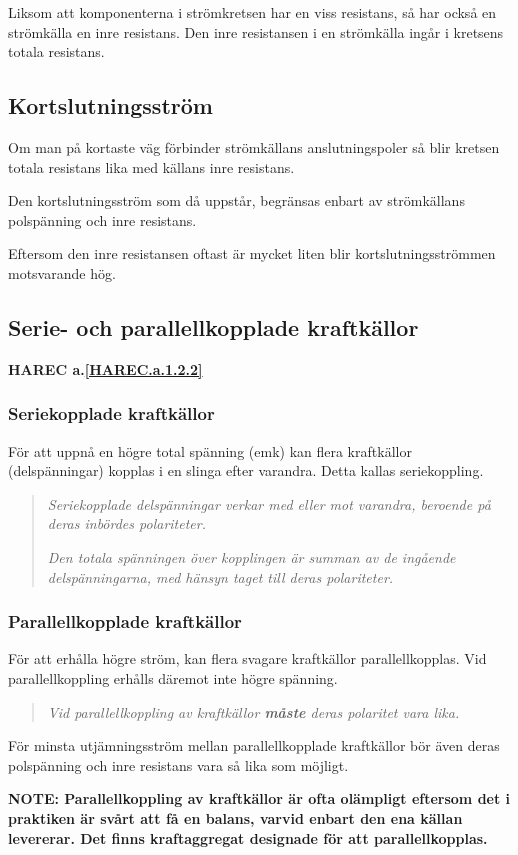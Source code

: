 Liksom att komponenterna i strömkretsen har en viss resistans, så har också en
strömkälla en inre resistans. Den inre resistansen i en strömkälla ingår i
kretsens totala resistans.

\subsection{Kortslutningsström}

Om man på kortaste väg förbinder strömkällans anslutningspoler så blir kretsen
totala resistans lika med källans inre resistans.

Den kortslutningsström som då uppstår, begränsas enbart av strömkällans
polspänning och inre resistans.

Eftersom den inre resistansen oftast är mycket liten blir kortslutningsströmmen
motsvarande hög.

\subsection{Serie- och parallellkopplade kraftkällor}
\textbf{HAREC a.\ref{HAREC.a.1.2.2}\label{myHAREC.a.1.2.2}}

\subsubsection{Seriekopplade kraftkällor}

För att uppnå en högre total spänning (emk) kan flera kraftkällor
(delspänningar) kopplas i en slinga efter varandra. Detta kallas seriekoppling.

\begin{quote}
\emph{Seriekopplade delspänningar verkar med eller mot varandra, beroende på
deras inbördes polariteter.}

\emph{Den totala spänningen över kopplingen är summan av de ingående
delspänningarna, med hänsyn taget till deras polariteter.}
\end{quote}

\subsubsection{Parallellkopplade kraftkällor}

För att erhålla högre ström, kan flera svagare kraftkällor parallellkopplas.
Vid parallellkoppling erhålls däremot inte högre spänning.

\begin{quote}
\emph{Vid parallellkoppling av kraftkällor \textbf{måste} deras polaritet vara lika.}
\end{quote}

För minsta utjämningsström mellan parallellkopplade kraftkällor bör även deras
polspänning och inre resistans vara så lika som möjligt.

\textbf{NOTE: Parallellkoppling av kraftkällor är ofta olämpligt eftersom det
i praktiken är svårt att få en balans, varvid enbart den ena källan levererar.
Det finns kraftaggregat designade för att parallellkopplas.}
